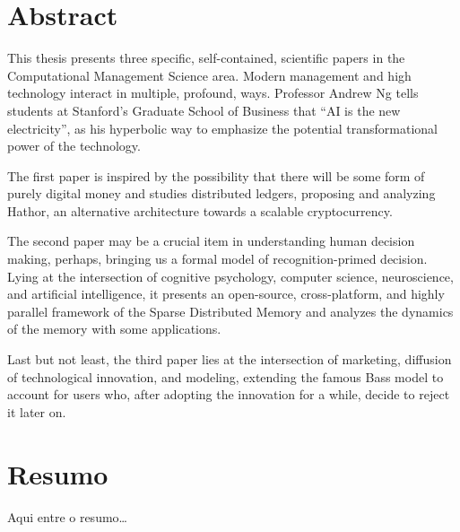 \begingroup
\let\clearpage\relax
\let\cleardoublepage\relax
\let\cleardoublepage\relax

\chapter*{Abstract}

This thesis presents three specific, self-contained, scientific papers in the Computational Management Science area.
Modern management and high technology interact in multiple, profound, ways. Professor Andrew Ng tells students at Stanford’s Graduate School of Business that ``AI is the new electricity'', as his hyperbolic way to emphasize the potential transformational power of the technology.

The first paper is inspired by the possibility that there will be some form of purely digital money and studies distributed ledgers, proposing and analyzing Hathor, an alternative architecture towards a scalable cryptocurrency.

The second paper may be a crucial item in understanding human decision making, perhaps, bringing us a formal model of recognition-primed decision. Lying at the intersection of cognitive psychology, computer science, neuroscience, and artificial intelligence, it presents an open-source, cross-platform, and highly parallel framework of the Sparse Distributed Memory and analyzes the dynamics of the memory with some applications.

Last but not least, the third paper lies at the intersection of marketing, diffusion of technological innovation, and modeling, extending the famous Bass model to account for users who, after adopting the innovation for a while, decide to reject it later on.

\vfill

\chapter*{Resumo}
Aqui entre o resumo\dots


\endgroup

\vfill
